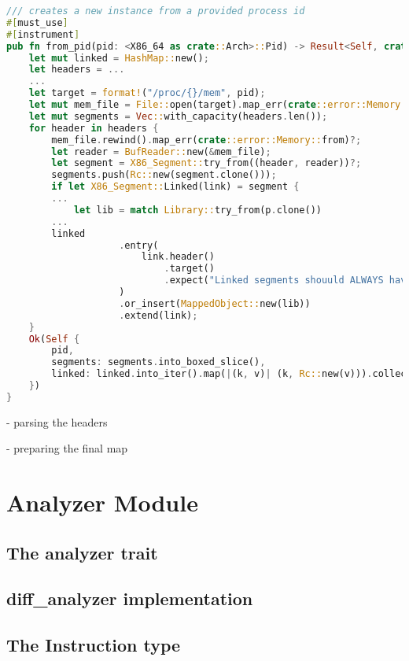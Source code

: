 \begin{lstlisting}[caption=\label{lst:map_from_pid}"Excerpt from x86\_64 Map's from\_pid function", language=Rust, breaklines=true]
/// creates a new instance from a provided process id
#[must_use]
#[instrument]
pub fn from_pid(pid: <X86_64 as crate::Arch>::Pid) -> Result<Self, crate::error::Error> {
    let mut linked = HashMap::new();
    let headers = ...
    ...
    let target = format!("/proc/{}/mem", pid);
    let mut mem_file = File::open(target).map_err(crate::error::Memory::from)?;
    let mut segments = Vec::with_capacity(headers.len());
    for header in headers {
        mem_file.rewind().map_err(crate::error::Memory::from)?;
        let reader = BufReader::new(&mem_file);
        let segment = X86_Segment::try_from((header, reader))?;
        segments.push(Rc::new(segment.clone()));
        if let X86_Segment::Linked(link) = segment {
        ...
            let lib = match Library::try_from(p.clone())
        ...
        linked
                    .entry(
                        link.header()
                            .target()
                            .expect("Linked segments shouuld ALWAYS have a valid target"),
                    )
                    .or_insert(MappedObject::new(lib))
                    .extend(link);
    }
    Ok(Self {
        pid,
        segments: segments.into_boxed_slice(),
        linked: linked.into_iter().map(|(k, v)| (k, Rc::new(v))).collect(),
    })
}
\end{lstlisting}

- parsing the headers


- preparing the final map

\section{Analyzer Module}
\label{analyzer}

\subsection{The analyzer trait}

\subsection{diff\_analyzer implementation}

\subsection{The Instruction type}

